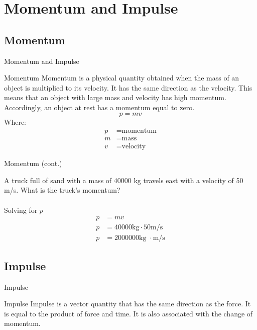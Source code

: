 \documentclass{beamer}
\begin{document}
\section{Momentum and Impulse}

\subsection{Momentum}



\begin{frame} {Momentum and Impulse}
	\begin{block}{Momentum}
		Momentum is a physical quantity obtained when the mass of an object is multiplied to its velocity. It has the same direction as the velocity. This means that an object with large mass and velocity has high momentum. Accordingly, an object at rest has a momentum equal to zero.
		\begin{equation}
			p = mv
		\end{equation}
		Where: 
		\begin{align*}
			p &= \text{momentum}\\
			m &= \text{mass}\\
			v &= \text{velocity}
		\end{align*}
	\end{block}
\end{frame}

\begin{frame}{Momentum (cont.)}
	\begin{example}
		A truck full of sand with a mass of 40000 kg travels east with a velocity of 50 m/s. What is the truck's momentum?\\~\\
		Solving for $p$
		\begin{align*}
			p &= mv\\
			p &= 40000\text{kg} \cdot 50 \text{m/s}\\
			p &= 2000000 \text{kg }\cdot \text{m/s}
		\end{align*}
	\end{example}
\end{frame}

\subsection{Impulse}

\begin{frame}{Impulse}
	\begin{block}{Impulse}
		Impulse is a vector quantity that has the same direction as the force. It is equal to the product of force and time. It is also associated with the change of momentum.
		
		
	\end{block}
\end{frame}
\end{document}
